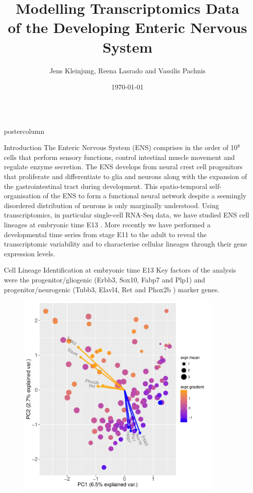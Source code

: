 \documentclass{beamer}
\title{\huge  Modelling Transcriptomics Data \\of the Developing Enteric Nervous System}
\author{Jens Kleinjung, Reena Lasrado and Vassilis Pachnis}
\institute[]{The Francis Crick Institute}
\date{\today}
\newlength{\columnheight}
\begin{document}
\begin{frame}
\begin{columns}
\begin{column}{.45\textwidth}
\begin{beamercolorbox}[center]{postercolumn}
\begin{minipage}{.98\textwidth}  %
\parbox[t][\columnheight]{\textwidth}{ %
\begin{myblock}{Introduction}
The Enteric Nervous System (ENS) comprises in the order of 10$^8$ cells that
perform sensory functions, control intestinal muscle movement and regulate
enzyme secretion. The ENS develops from neural crest cell progenitors that
proliferate and differentiate to glia and neurons along with the expansion
of the gastrointestinal tract during development.
This spatio-temporal self-organisation of the ENS to form a functional
neural network despite a seemingly disordered distribution of neurons is
only marginally understood.
Using transcriptomics, in particular single-cell RNA-Seq data, we have studied
ENS cell lineages at embryonic time E13 \cite{Lasrado_2017}.
More recently we have performed a developmental time series from stage E11 to
the adult to reveal the transcriptomic variability and to characterise cellular
lineages through their gene expression levels.
\end{myblock}\vfill
\begin{myblock}{Cell Lineage Identification at embryonic time E13}
Key factors of the analysis were the
progenitor/gliogenic (Erbb3, Sox10, Fabp7 and Plp1) and
progenitor/neurogenic (Tubb3, Elavl4, Ret and Phox2b )
marker genes.
\begin{figure}
\begin{minipage}{0.9\textwidth}
	\includegraphics[width=0.9\textwidth]{./biplot_semisuperv}

\end{minipage}
\end{figure}
\end{myblock}}
\end{minipage}
\end{beamercolorbox}
\end{column}
\end{columns}
\end{frame}
\end{document}
